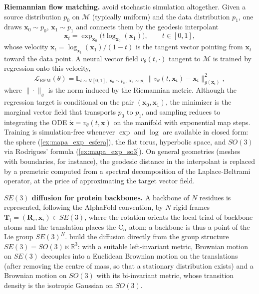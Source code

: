 \textbf{Riemannian flow matching.} \citet{chen2024flowmatchinggeometries} avoid stochastic simulation altogether. Given a source distribution $p_0$ on $\mathcal{M}$ (typically uniform) and the data distribution $p_1$, one draws $\mathbf{x}_0 \sim p_0$, $\mathbf{x}_1 \sim p_1$ and connects them by the geodesic interpolant
\begin{equation}
    \mathbf{x}_t = \exp_{\mathbf{x}_0}\!\big(t \log_{\mathbf{x}_0}(\mathbf{x}_1)\big), \qquad t \in [0, 1],
\end{equation}
whose velocity $\dot{\mathbf{x}}_t = \log_{\mathbf{x}_t}(\mathbf{x}_1)/(1 - t)$ is the tangent vector pointing from $\mathbf{x}_t$ toward the data point. A neural vector field $v_\theta(t, \cdot)$ tangent to $\mathcal{M}$ is trained by regression onto this velocity,
\begin{equation}\label{eq:riemannian_flow_matching}
    \mathcal{L}_{\text{RFM}}(\theta) = \mathbb{E}_{t \sim \mathcal{U}[0,1],\; \mathbf{x}_0 \sim p_0,\; \mathbf{x}_1 \sim p_1}\, \big\| v_\theta(t, \mathbf{x}_t) - \dot{\mathbf{x}}_t \big\|^2_{g(\mathbf{x}_t)},
\end{equation}
where $\|\cdot\|_{g}$ is the norm induced by the Riemannian metric. Although the regression target is conditional on the pair $(\mathbf{x}_0, \mathbf{x}_1)$, the minimizer is the marginal vector field that transports $p_0$ to $p_1$, and sampling reduces to integrating the ODE $\dot{\mathbf{x}} = v_\theta(t, \mathbf{x})$ on the manifold with exponential map steps. Training is simulation-free whenever $\exp$ and $\log$ are available in closed form: the sphere (\autoref{ex:mapa_exp_esfera}), the flat torus, hyperbolic space, and $SO(3)$ via Rodrigues' formula (\autoref{ex:mapa_exp_so3}). On general geometries (meshes with boundaries, for instance), the geodesic distance in the interpolant is replaced by a premetric computed from a spectral decomposition of the Laplace-Beltrami operator, at the price of approximating the target vector field.

\textbf{$SE(3)$ diffusion for protein backbones.} A backbone of $N$ residues is represented, following the AlphaFold convention, by $N$ rigid frames $\mathbf{T}_i = (\mathbf{R}_i, \mathbf{x}_i) \in SE(3)$, where the rotation orients the local triad of backbone atoms and the translation places the $\text{C}_\alpha$ atom; a backbone is thus a point of the Lie group $SE(3)^N$. \citet{yim2023se3diffusion} build the diffusion directly from the group structure $SE(3) = SO(3) \ltimes \mathbb{R}^3$: with a suitable left-invariant metric, Brownian motion on $SE(3)$ decouples into a Euclidean Brownian motion on the translations (after removing the centre of mass, so that a stationary distribution exists) and a Brownian motion on $SO(3)$ with its bi-invariant metric, whose transition density is the isotropic Gaussian on $SO(3)$.

